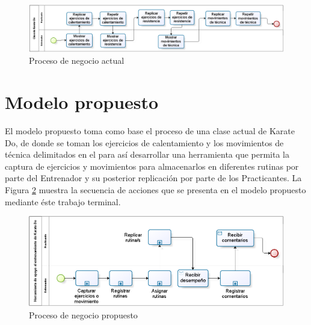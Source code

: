 \begin{enumerate}
	\begin{figure}[H]
		\begin{center}
			\includegraphics[scale=0.45]{./Figuras/Negocio/Proceso_de_Negocio_actual}
		\end{center}
		\caption{Proceso de negocio actual}
		\label{fig:PN_Actual}
	\end{figure}

\end{enumerate}

\section{Modelo propuesto}
El modelo propuesto toma como base el proceso de una clase actual de Karate Do, de donde se toman los ejercicios de calentamiento y los movimientos de técnica delimitados en el  para así desarrollar una herramienta que permita la captura de ejercicios y movimientos para almacenarlos en diferentes rutinas por parte del Entrenador y su posterior replicación por parte de los Practicantes. La Figura \ref{fig:PN_Propuesto}  muestra la secuencia de acciones que se presenta en el modelo propuesto mediante éste trabajo terminal.\\

\begin{figure}[H]
	\begin{center}
		\includegraphics[scale=0.65]{./Figuras/Negocio/Proceso_de_Negocio_propuesto}
	\end{center}
	\caption{Proceso de negocio propuesto}
	\label{fig:PN_Propuesto}
\end{figure}

